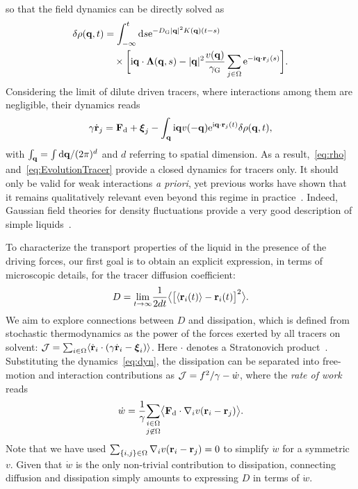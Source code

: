 \documentclass[pre, superscriptaddress, twocolumn,pre]{revtex4-1}
\newcommand{\dd}{\text{d}}
\newcommand{\ee}{\text{e}}
\newcommand{\ii}{\text{i}}
\begin{document}
so that the field dynamics can be directly solved as
\begin{equation}\label{eq:rho}
	\begin{aligned}
		\delta\rho({\bf q},t) &= \int_{-\infty}^t \dd s \ee^{-D_{\rm G} |{\bf q}|^2 K({\bf q})(t-s)}
		\\
		&\quad\times \bigg[ \ii{\bf q} \cdot {\boldsymbol\Lambda}({\bf q},s) - |{\bf q}|^2 \frac{v({\bf q})}{\gamma_{\rm G}} \sum_{j\in\Omega}\ee^{-\ii {\bf q}\cdot {\bf r}_j(s)}\bigg] .
	\end{aligned}
\end{equation}
Considering the limit of dilute driven tracers, where interactions among them are negligible, their dynamics reads
\begin{equation}\label{eq:EvolutionTracer}
	\gamma\dot{\bf r}_j = {\bf F}_\text{d} + {\boldsymbol\xi_j} - \int_{\bf q} \ii{\bf q} v(-{\bf q})\ee^{\ii{\bf q} \cdot {\bf r}_j(t)} \delta \rho({\bf q}, t) ,
\end{equation}
with $\int_{\bf q}=\int\dd{\bf q}/(2\pi)^d$ and $d$ referring to spatial dimension. As a result,~\eqref{eq:rho} and~\eqref{eq:EvolutionTracer} provide a  closed dynamics for tracers only. It should only be valid for weak interactions {\it a priori}, yet previous works have shown that it remains qualitatively relevant even beyond this regime in practice~\cite{Demery2015, Martin2018, Nemoto2018a}. Indeed, Gaussian field theories for density fluctuations provide a very good description of simple liquids~\cite{Chandler1993}.


To characterize the transport properties of the liquid in the presence of the driving forces, our first goal is to obtain an explicit expression, in terms of microscopic details, for the tracer diffusion coefficient:
\begin{equation}
	D = \underset{t\to\infty}{\lim} \frac{1}{2dt} \big\langle \big[\langle{\bf r}_i(t)\rangle-{\bf r}_i(t)\big]^2 \big\rangle .
\end{equation}
We aim to explore connections between $D$ and dissipation, which is defined from stochastic thermodynamics as the power of the forces exerted by all tracers on solvent: ${\cal J} = \sum_{i\in\Omega}\langle\dot{\bf r}_i\cdot(\gamma\dot{\bf r}_i-{\boldsymbol\xi}_i)\rangle$. Here $\cdot$ denotes a Stratonovich product~\cite{Sekimoto1998, Seifert2012}. Substituting the dynamics~\eqref{eq:dyn}, the dissipation can be separated into free-motion and interaction contributions as ${\cal J} = f^2/\gamma - \dot w$, where the {\it rate of work} reads
\begin{equation}\label{eq:work}
	\dot w = \frac{1}{\gamma} \underset{j\not\in\Omega}{\sum_{i\in\Omega}}\big\langle {\bf F}_{\rm d}\cdot\nabla_iv({\bf r}_i-{\bf r}_j)\big\rangle.
\end{equation}
Note that we have used $\sum_{\{i,j\}\in\Omega}\nabla_iv({\bf r}_i-{\bf r}_j)=0$ to simplify $\dot w$ for a symmetric $v$. Given that $\dot w$ is the only non-trivial contribution to dissipation, connecting diffusion and dissipation simply amounts to expressing $D$ in terms of $\dot w$.
\end{document}
